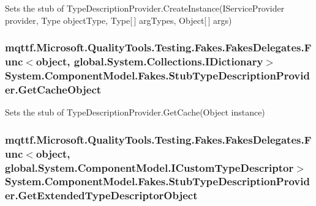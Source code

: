Sets the stub of Type\-Description\-Provider.\-Create\-Instance(\-I\-Service\-Provider provider, Type object\-Type, Type\mbox{[}$\,$\mbox{]} arg\-Types, Object\mbox{[}$\,$\mbox{]} args)

\hypertarget{class_system_1_1_component_model_1_1_fakes_1_1_stub_type_description_provider_aab2d06bff6c58bd8bbb5b07f00d6ea2c}{
\subsubsection[{Get\-Cache\-Object}]{\setlength{\rightskip}{0pt plus 5cm}mqttf.\-Microsoft.\-Quality\-Tools.\-Testing.\-Fakes.\-Fakes\-Delegates.\-Func$<$object, global.\-System.\-Collections.\-I\-Dictionary$>$ System.\-Component\-Model.\-Fakes.\-Stub\-Type\-Description\-Provider.\-Get\-Cache\-Object}}\label{class_system_1_1_component_model_1_1_fakes_1_1_stub_type_description_provider_aab2d06bff6c58bd8bbb5b07f00d6ea2c}


Sets the stub of Type\-Description\-Provider.\-Get\-Cache(\-Object instance)

\hypertarget{class_system_1_1_component_model_1_1_fakes_1_1_stub_type_description_provider_a23cc8cdb7e5878029c16538be30037af}{
\subsubsection[{Get\-Extended\-Type\-Descriptor\-Object}]{\setlength{\rightskip}{0pt plus 5cm}mqttf.\-Microsoft.\-Quality\-Tools.\-Testing.\-Fakes.\-Fakes\-Delegates.\-Func$<$object, global.\-System.\-Component\-Model.\-I\-Custom\-Type\-Descriptor$>$ System.\-Component\-Model.\-Fakes.\-Stub\-Type\-Description\-Provider.\-Get\-Extended\-Type\-Descriptor\-Object}}\label{class_system_1_1_component_model_1_1_fakes_1_1_stub_type_description_provider_a23cc8cdb7e5878029c16538be30037af}


